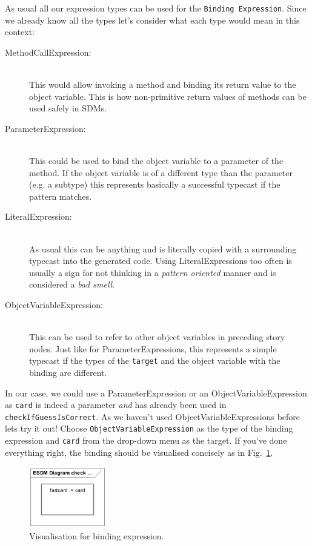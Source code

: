 \clearpage

As usual all our expression types can be used for the \texttt{Binding
Expression}.  Since we already know all the types let's consider what each type
would mean in this context: 
\begin{description}
  \item[MethodCallExpression:]~\\ This would allow invoking a method and binding
  its return value to the object variable.  This is how non-primitive return
  values of methods can be used safely in SDMs.
  \item[ParameterExpression:]~\\ This could be used to bind the object variable
  to a parameter of the method.  If the object variable is of a different type
  than the parameter (e.g. a subtype) this represents basically a successful
  typecast if the pattern matches.
  \item[LiteralExpression:]~\\ As usual this can be anything and is literally
  copied with a surrounding typecast into the generated code.  Using
  LiteralExpressions too often is usually a sign for not thinking in a
  \emph{pattern oriented} manner and is considered a \emph{bad smell}.
  \item[ObjectVariableExpression:]~\\ This can be used to refer to other object
  variables in preceding story nodes.  Just like for ParameterExpressions, this
  represents a simple typecast if the types of the \texttt{target} and the
  object variable with the binding are different.
\end{description}

In our case, we could use a ParameterExpression or an ObjectVariableExpression as
\texttt{card} is indeed a parameter \emph{and} has already been used in
\texttt{checkIfGuessIsCorrect}.  As we haven't used ObjectVariableExpressions
before lets try it out!  Choose \texttt{ObjectVariableExpression} as the type of
the binding expression and \texttt{card} from the drop-down menu as the target. 
If you've done everything right, the binding should be visualised concisely as
in Fig.~\ref{fig:sdm_fastcard_4}.
 
\begin{figure}[htbp]
\begin{center}
  \includegraphics[width=0.3\textwidth]{pics/sdmBilder/bindings/visual_bindingexp}
  \caption{Visualisation for binding expression.}  
  \label{fig:sdm_fastcard_4}
\end{center}
\end{figure}

